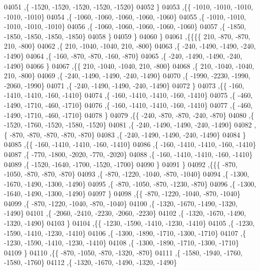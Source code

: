\begin{DoxyCode}
04051     ,\{ -1520, -1520, -1520, -1520, -1520\}
04052     \}
04053    ,\{\{ -1010, -1010, -1010, -1010, -1010\}
04054     ,\{ -1060, -1060, -1060, -1060, -1060\}
04055     ,\{ -1010, -1010, -1010, -1010, -1010\}
04056     ,\{ -1060, -1060, -1060, -1060, -1060\}
04057     ,\{ -1850, -1850, -1850, -1850, -1850\}
04058     \}
04059    \}
04060   \}
04061  ,\{\{\{\{   210,  -870,  -870,   210,  -800\}
04062     ,\{   210, -1040, -1040,   210,  -800\}
04063     ,\{  -240, -1490, -1490,  -240, -1490\}
04064     ,\{  -160,  -870,  -870,  -160,  -870\}
04065     ,\{  -240, -1490, -1490,  -240, -1490\}
04066     \}
04067    ,\{\{   210, -1040, -1040,   210,  -800\}
04068     ,\{   210, -1040, -1040,   210,  -800\}
04069     ,\{  -240, -1490, -1490,  -240, -1490\}
04070     ,\{ -1990, -2230, -1990, -2060, -1990\}
04071     ,\{  -240, -1490, -1490,  -240, -1490\}
04072     \}
04073    ,\{\{  -160, -1410, -1410,  -160, -1410\}
04074     ,\{  -160, -1410, -1410,  -160, -1410\}
04075     ,\{  -460, -1490, -1710,  -460, -1710\}
04076     ,\{  -160, -1410, -1410,  -160, -1410\}
04077     ,\{  -460, -1490, -1710,  -460, -1710\}
04078     \}
04079    ,\{\{  -240,  -870,  -870,  -240,  -870\}
04080     ,\{ -1520, -1760, -1520, -1580, -1520\}
04081     ,\{  -240, -1490, -1490,  -240, -1490\}
04082     ,\{  -870,  -870,  -870,  -870,  -870\}
04083     ,\{  -240, -1490, -1490,  -240, -1490\}
04084     \}
04085    ,\{\{  -160, -1410, -1410,  -160, -1410\}
04086     ,\{  -160, -1410, -1410,  -160, -1410\}
04087     ,\{  -770, -1800, -2020,  -770, -2020\}
04088     ,\{  -160, -1410, -1410,  -160, -1410\}
04089     ,\{ -1520, -1640, -1700, -1520, -1700\}
04090     \}
04091    \}
04092   ,\{\{\{  -870, -1050,  -870,  -870,  -870\}
04093     ,\{  -870, -1220, -1040,  -870, -1040\}
04094     ,\{ -1300, -1670, -1490, -1300, -1490\}
04095     ,\{  -870, -1050,  -870, -1230,  -870\}
04096     ,\{ -1300, -1640, -1490, -1300, -1490\}
04097     \}
04098    ,\{\{  -870, -1220, -1040,  -870, -1040\}
04099     ,\{  -870, -1220, -1040,  -870, -1040\}
04100     ,\{ -1320, -1670, -1490, -1320, -1490\}
04101     ,\{ -2060, -2410, -2230, -2060, -2230\}
04102     ,\{ -1320, -1670, -1490, -1320, -1490\}
04103     \}
04104    ,\{\{ -1230, -1590, -1410, -1230, -1410\}
04105     ,\{ -1230, -1590, -1410, -1230, -1410\}
04106     ,\{ -1300, -1890, -1710, -1300, -1710\}
04107     ,\{ -1230, -1590, -1410, -1230, -1410\}
04108     ,\{ -1300, -1890, -1710, -1300, -1710\}
04109     \}
04110    ,\{\{  -870, -1050,  -870, -1320,  -870\}
04111     ,\{ -1580, -1940, -1760, -1580, -1760\}
04112     ,\{ -1320, -1670, -1490, -1320, -1490\}

\end{DoxyCode}
